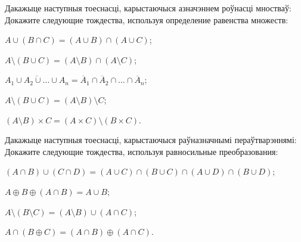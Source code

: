 


	
	
	\begin{problemList}

	\problemItemWithCommonPart
	{Дакажыце наступныя тоеснасці, карыстаючыся азначэннем роўнасці мностваў:}
	{Докажите следующие тождества, используя определение равенства множеств:}
	{%
	\begin{belarusianEnumerate}
		
	\item $A \cup (B \cap C) = (A \cup B) \cap (A \cup C)$;
	
	\item $A \setminus (B \cup C) = (A \setminus B) \cap (A \setminus C)$;
	
	\item $\overline{A_1 \cup A_2 \cup \ldots \cup A_n} = \overline{A}_1 \cap \overline{A}_2 \cap \ldots \cap \overline{A}_n$;
	
	\item $A \setminus (B \cup C) = (A \setminus B) \setminus C$;
	
	\item $(A \setminus B) \times C = (A \times C) \setminus (B \times C)$.
		
	\end{belarusianEnumerate}
	}
	
	\bigskip
	
	\problemItemWithCommonPart
	{Дакажыце наступныя тоеснасці, карыстаючыся раўназначнымі пераўтварэннямі:}
	{Докажите следующие тождества, используя равносильные преобразования:}
	{%
	\begin{belarusianEnumerate}
		
	\item $(A \cap B) \cup (C \cap D) = (A \cup C) \cap (B \cup C) \cap (A \cup D) \cap (B \cup D)$;
	
	\item $A \oplus B \oplus (A \cap B) = A \cup B$;
	
	\item $A \setminus (B \setminus C) = (A \setminus B) \cup (A \cap C)$;
	
	\item $A \cap (B \oplus C) = (A \cap B) \oplus (A \cap C)$.
		
	\end{belarusianEnumerate}
	}

	\bigskip
	

\end{problemList}
